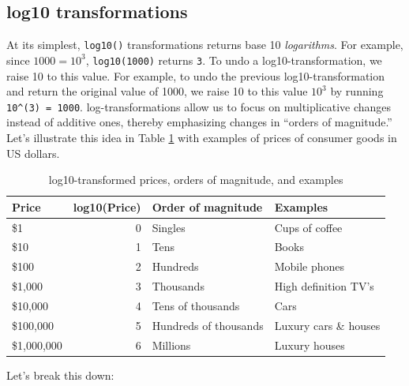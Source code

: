 \documentclass[12pt,]{krantz}
\theoremstyle{definition}
\theoremstyle{definition}
\theoremstyle{definition}
\theoremstyle{remark}
\begin{document}
\subsection{log10 transformations}\label{log10-transformations}

At its simplest, \texttt{log10()} transformations returns base 10
\emph{logarithms}. For example, since \(1000 = 10^3\),
\texttt{log10(1000)} returns \texttt{3}. To undo a log10-transformation,
we raise 10 to this value. For example, to undo the previous
log10-transformation and return the original value of 1000, we raise 10
to this value \(10^{3}\) by running \texttt{10\^{}(3)\ =\ 1000}.
log-transformations allow us to focus on multiplicative changes instead
of additive ones, thereby emphasizing changes in ``orders of
magnitude.'' Let's illustrate this idea in Table \ref{tab:logten} with
examples of prices of consumer goods in US dollars.

\begin{table}[H]

\caption{\label{tab:logten}log10-transformed prices, orders of magnitude, and examples}
\centering
\fontsize{10}{12}\selectfont
\begin{tabular}[t]{lrll}
\toprule
Price & log10(Price) & Order of magnitude & Examples\\
\midrule
\$1 & 0 & Singles & Cups of coffee\\
\$10 & 1 & Tens & Books\\
\$100 & 2 & Hundreds & Mobile phones\\
\$1,000 & 3 & Thousands & High definition TV's\\
\$10,000 & 4 & Tens of thousands & Cars\\
\addlinespace
\$100,000 & 5 & Hundreds of thousands & Luxury cars \& houses\\
\$1,000,000 & 6 & Millions & Luxury houses\\
\bottomrule
\end{tabular}
\end{table}

Let's break this down:
\end{document}
